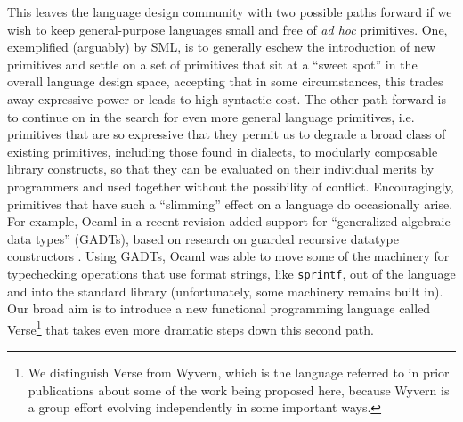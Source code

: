 \newpage %
This leaves the language design community with two possible paths forward if we wish to keep general-purpose languages small and free of \emph{ad hoc} primitives. One, exemplified (arguably) by SML, is to generally eschew the introduction of new primitives and settle on a set of primitives that sit at a ``sweet spot'' in the overall language design space, accepting that in some circumstances, this trades away expressive power or leads to  high syntactic cost. %
The other path forward is to continue on in the search for even more general language primitives, i.e. primitives that are so expressive that they permit us to degrade a broad class of existing primitives, including those found in dialects, to modularly composable library constructs, so that they can be evaluated on their individual merits by programmers and used together without the possibility of conflict. %
Encouragingly, primitives that have such a ``slimming'' effect on a language do occasionally arise. For example, Ocaml in a recent revision added support for  ``generalized algebraic data types'' (GADTs), based on research on guarded recursive datatype constructors \cite{XiCheChe03}. Using GADTs, Ocaml was able to move some of the machinery for typechecking operations that use format strings, like \texttt{sprintf}, out of the language and into the standard library (unfortunately, some machinery remains built in). 
Our broad aim is to introduce a new functional programming language called Verse\footnote{We distinguish Verse from Wyvern, which is the language referred to in prior publications about some of the work being proposed here, because Wyvern is a group effort evolving independently in some important ways.} that takes even more dramatic steps down this second path. %


